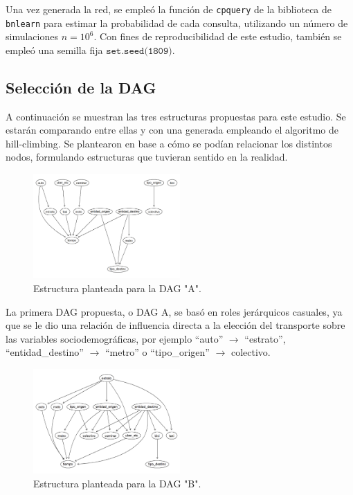 \documentclass[eng]{ajceam-class}
\begin{document}
Una vez generada la red, se empleó la función de \texttt{cpquery} de la biblioteca de \texttt{bnlearn} para estimar la probabilidad de cada consulta, utilizando un número de simulaciones $n = 10^6$. Con fines de reproducibilidad de este estudio, también se empleó una semilla fija $\texttt{set.seed(1809)}$.

\subsection{Selección de la DAG}
A continuación se muestran las tres estructuras propuestas para este estudio. Se estarán comparando entre ellas y con una generada empleando el algoritmo de hill-climbing. Se plantearon en base a cómo se podían relacionar los distintos nodos, formulando estructuras que tuvieran sentido en la realidad.

\begin{figure}[H] %
    \centering
    \includegraphics[width=0.5\textwidth]{DAG_a.png}
    \caption{Estructura planteada para la DAG "A".}
\end{figure}

La primera DAG propuesta, o DAG A, se basó en roles jerárquicos casuales, ya que se le dio una relación de influencia directa a la elección del transporte sobre las variables sociodemográficas, por ejemplo “auto” $\to$ “estrato”, “entidad\_destino” $\to$ “metro” o “tipo\_origen” $\to$ colectivo.

\begin{figure}[H] %
    \centering
    \includegraphics[width=0.5\textwidth]{DAG_b.png}
    \caption{Estructura planteada para la DAG "B".}
\end{figure}
\end{document}
